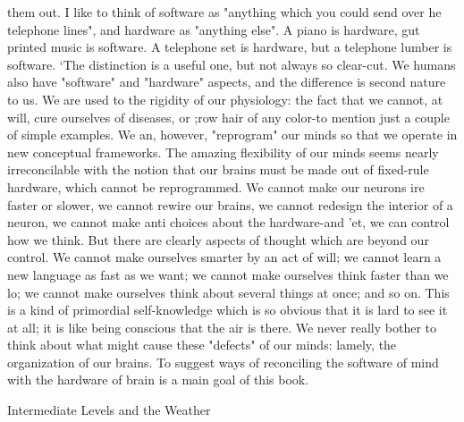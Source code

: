        them out. I like to think of software as "anything which you could send over he
       telephone lines", and hardware as "anything else". A piano is hardware, gut
       printed music is software. A telephone set is hardware, but a telephone lumber is
       software. `The distinction is a useful one, but not always so clear-cut.
               We humans also have "software" and "hardware" aspects, and the
       difference is second nature to us. We are used to the rigidity of our physiology:
       the fact that we cannot, at will, cure ourselves of diseases, or ;row hair of any
       color-to mention just a couple of simple examples. We an, however, "reprogram"
       our minds so that we operate in new conceptual frameworks. The amazing
       flexibility of our minds seems nearly irreconcilable with the notion that our brains
       must be made out of fixed-rule hardware, which cannot be reprogrammed. We
       cannot make our neurons ire faster or slower, we cannot rewire our brains, we
       cannot redesign the interior of a neuron, we cannot make anti choices about the
       hardware-and 'et, we can control how we think.
               But there are clearly aspects of thought which are beyond our control. We
       cannot make ourselves smarter by an act of will; we cannot learn a new language
       as fast as we want; we cannot make ourselves think faster than we lo; we cannot
       make ourselves think about several things at once; and so on. This is a kind of
       primordial self-knowledge which is so obvious that it is lard to see it at all; it is
       like being conscious that the air is there. We never really bother to think about
       what might cause these "defects" of our minds: lamely, the organization of our
       brains. To suggest ways of reconciling the software of mind with the hardware of
       brain is a main goal of this book.

                                 Intermediate Levels and the Weather

